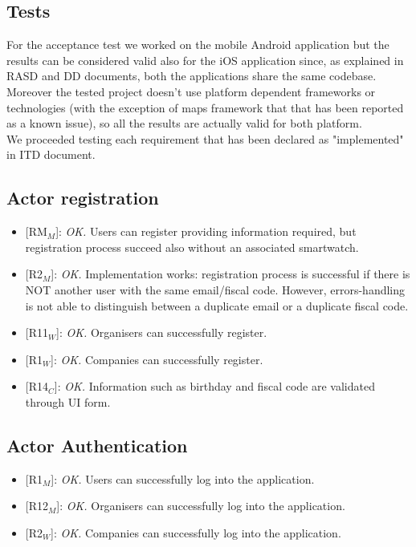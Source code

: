 \documentclass{article}
\begin{document}
\subsection{Tests}

For the acceptance test we worked on the mobile Android application but the results can be considered valid also for the iOS application  since, as explained  in RASD and DD documents, both the applications share the same codebase. Moreover the tested project doesn't use platform dependent frameworks or technologies (with the exception of maps framework that that has been reported as a known issue), so all the results are actually valid for both platform.\newline
\\We proceeded testing each requirement that has been declared as "implemented" in ITD document.

\subsection{Actor registration}
\begin{itemize}
	\item {[RM$_M$]}: \textit{OK.} Users can register providing information required, but registration process succeed also without an associated smartwatch.
	\item {[R2$_M$]}: \textit{OK.} Implementation works: registration process is successful if  there is NOT another user with the same email/fiscal code. However, errors-handling is not able to distinguish between a duplicate email or a duplicate fiscal code.
	\item {[R11$_W$]}: \textit{OK.} Organisers can successfully register.
	\item {[R1$_W$]}: \textit{OK.} Companies can successfully register.
	\item {[R14$_C$]}: \textit{OK.} Information such as birthday and fiscal code are validated through UI form.
\end{itemize}

\subsection{Actor Authentication} 
\begin{itemize}
	\item {[R1$_M$]}: \textit{OK.} Users can successfully log into the application.
	\item {[R12$_M$]}: \textit{OK.} Organisers can successfully log into the application.
	\item {[R2$_W$]}: \textit{OK.} Companies  can successfully log into the application.
\end{itemize}
\end{document}
